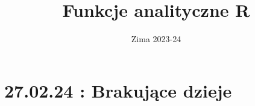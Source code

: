 \documentclass[a5paper, twoside]{article}
\title{Funkcje analityczne R}
\author{}
\date{Zima 2023-24}
\begin{document}

\maketitle
\thispagestyle{empty} 
\newpage

\tableofcontents
\thispagestyle{empty}
\newpage

\pagestyle{fancy}



\section{27.02.24 : Brakujące dzieje}




\end{document}

